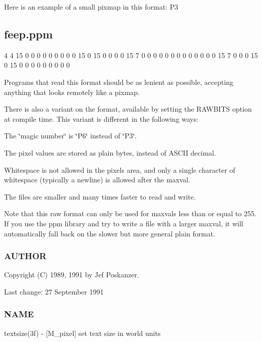 Here is an example of a small pixmap in this format\+: P3 \subsection*{feep.\+ppm}

4 4 15 0 0 0 0 0 0 0 0 0 15 0 15 0 0 0 0 15 7 0 0 0 0 0 0 0 0 0 0 0 0 0 15 7 0 0 0 15 0 15 0 0 0 0 0 0 0 0 0

Programs that read this format should be as lenient as possible, accepting anything that looks remotely like a pixmap.

There is also a variant on the format, available by setting the R\+A\+W\+B\+I\+TS option at compile time. This variant is different in the following ways\+:


\begin{DoxyItemize}
\item The \char`\"{}magic number\char`\"{} is \char`\"{}\+P6\char`\"{} instead of \char`\"{}\+P3\char`\"{}.
\item The pixel values are stored as plain bytes, instead of A\+S\+C\+II decimal.
\item Whitespace is not allowed in the pixels area, and only a single character of whitespace (typically a newline) is allowed after the maxval.
\item The files are smaller and many times faster to read and write.
\end{DoxyItemize}

Note that this raw format can only be used for maxvals less than or equal to 255. If you use the ppm library and try to write a file with a larger maxval, it will automatically fall back on the slower but more general plain format.

\subsubsection*{A\+U\+T\+H\+OR}

Copyright (C) 1989, 1991 by Jef Poskanzer. \begin{DoxyVerb}        Last change: 27 September 1991 \end{DoxyVerb}


\subsubsection*{N\+A\+ME}

textsize(3f) -\/ \mbox{[}M\+\_\+pixel\mbox{]} set text size in world units

